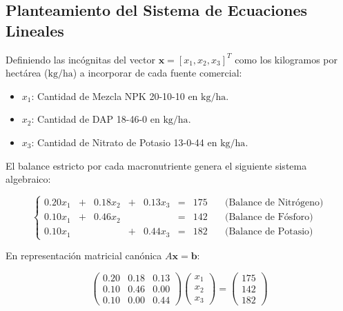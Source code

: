 \subsection{Planteamiento del Sistema de Ecuaciones Lineales}

Definiendo las incógnitas del vector $\mathbf{x} = [x_1, x_2, x_3]^T$ como los kilogramos por hectárea ($\text{kg/ha}$) a incorporar de cada fuente comercial:

\begin{itemize}

    \item $x_1$: Cantidad de Mezcla NPK 20-10-10 en $\text{kg/ha}$.

    \item $x_2$: Cantidad de DAP 18-46-0 en $\text{kg/ha}$.

    \item $x_3$: Cantidad de Nitrato de Potasio 13-0-44 en $\text{kg/ha}$.

\end{itemize}

El balance estricto por cada macronutriente genera el siguiente sistema algebraico:

\begin{equation}
\label{eq:sistema_escalar}
\left\{
\begin{alignedat}{4}
0.20 x_1 & {}+{} & 0.18 x_2 & {}+{} & 0.13 x_3 & {}={} & 175 \quad &\text{(Balance de Nitrógeno)} \\
0.10 x_1 & {}+{} & 0.46 x_2 &       &          & {}={} & 142 \quad &\text{(Balance de Fósforo)} \\
0.10 x_1 &       &          & {}+{} & 0.44 x_3 & {}={} & 182 \quad &\text{(Balance de Potasio)}
\end{alignedat}
\right.
\end{equation}

En representación matricial canónica $A\mathbf{x} = \mathbf{b}$:

\begin{equation}
\label{eq:sistema_matricial}
\begin{pmatrix}
0.20 & 0.18 & 0.13 \\
0.10 & 0.46 & 0.00 \\
0.10 & 0.00 & 0.44
\end{pmatrix}
\begin{pmatrix}
x_1 \\ x_2 \\ x_3
\end{pmatrix}
=
\begin{pmatrix}
175 \\ 142 \\ 182
\end{pmatrix}
\end{equation}

